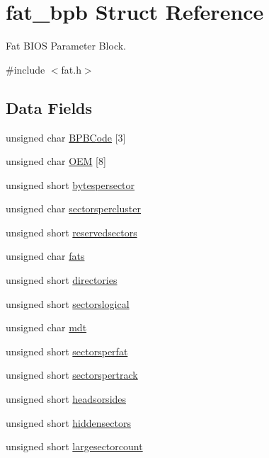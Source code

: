 \hypertarget{structfat__bpb}{}\section{fat\+\_\+bpb Struct Reference}
\label{structfat__bpb}


Fat B\+I\+OS Parameter Block.  




{\ttfamily \#include $<$fat.\+h$>$}

\subsection*{Data Fields}
\begin{DoxyCompactItemize}
\item 
unsigned char \hyperlink{structfat__bpb_a692e2fbe0857aa497a3bcf8ef2f14a5d_a692e2fbe0857aa497a3bcf8ef2f14a5d}{B\+P\+B\+Code} \mbox{[}3\mbox{]}
\item 
unsigned char \hyperlink{structfat__bpb_a1ea9743362295df1f3354a68fb30db97_a1ea9743362295df1f3354a68fb30db97}{O\+EM} \mbox{[}8\mbox{]}
\item 
unsigned short \hyperlink{structfat__bpb_a99b879ef2b4ebb9d64c3cd29a098cef8_a99b879ef2b4ebb9d64c3cd29a098cef8}{bytespersector}
\item 
unsigned char \hyperlink{structfat__bpb_a7d24a3d215b2b5dadf3b49d8efe669fa_a7d24a3d215b2b5dadf3b49d8efe669fa}{sectorspercluster}
\item 
unsigned short \hyperlink{structfat__bpb_ab9240f9a3403f33a95ccf401d5352262_ab9240f9a3403f33a95ccf401d5352262}{reservedsectors}
\item 
unsigned char \hyperlink{structfat__bpb_a5c0fe7a49a7ebb19df4fad6978b09ead_a5c0fe7a49a7ebb19df4fad6978b09ead}{fats}
\item 
unsigned short \hyperlink{structfat__bpb_a9d593b3eed8b2aad45be25375b167b39_a9d593b3eed8b2aad45be25375b167b39}{directories}
\item 
unsigned short \hyperlink{structfat__bpb_a12a8f2901c0f6428083170c0c50f3f7a_a12a8f2901c0f6428083170c0c50f3f7a}{sectorslogical}
\item 
unsigned char \hyperlink{structfat__bpb_a238908353debb66f7bf5e1da634a394b_a238908353debb66f7bf5e1da634a394b}{mdt}
\item 
unsigned short \hyperlink{structfat__bpb_a4ed1d127c7be8fac9744a64b1f3934a4_a4ed1d127c7be8fac9744a64b1f3934a4}{sectorsperfat}
\item 
unsigned short \hyperlink{structfat__bpb_aa099f2bcf792b7a36f280173637741dc_aa099f2bcf792b7a36f280173637741dc}{sectorspertrack}
\item 
unsigned short \hyperlink{structfat__bpb_a5a2f522bdb24c8feac1d5d4de06eced1_a5a2f522bdb24c8feac1d5d4de06eced1}{headsorsides}
\item 
unsigned short \hyperlink{structfat__bpb_ae9cc695264914815727335037bb53b32_ae9cc695264914815727335037bb53b32}{hiddensectors}
\item 
unsigned short \hyperlink{structfat__bpb_ad5e6c760595c91f1838f166521e7b095_ad5e6c760595c91f1838f166521e7b095}{largesectorcount}
\end{DoxyCompactItemize}


